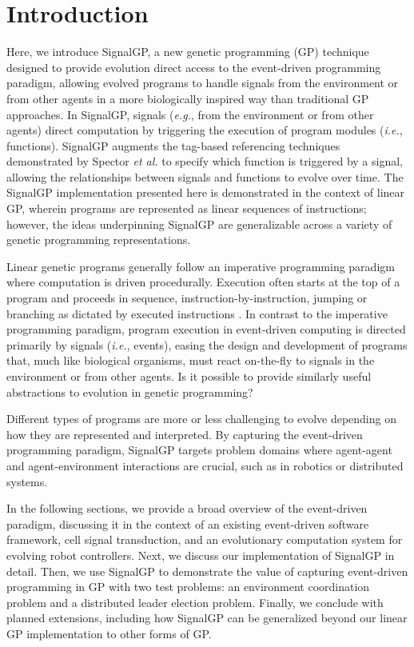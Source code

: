 \section{Introduction}

Here, we introduce SignalGP, a new genetic programming (GP) technique designed to provide evolution direct access to the event-driven programming paradigm, allowing evolved programs to handle signals from the environment or from other agents in a more biologically inspired way than traditional GP approaches. 
In SignalGP, signals (\textit{e.g.}, from the environment or from other agents) direct computation by triggering the execution of program modules (\textit{i.e.}, functions). 
SignalGP augments the tag-based referencing techniques demonstrated by Spector \textit{et al.}
\citep{spector_tag-based_2011,spector_whats_2011,spector_tag-based_2012} to specify which function is triggered by a signal, allowing the relationships between signals and functions to evolve over time. 
The SignalGP implementation presented here is demonstrated in the context of linear GP, wherein programs are represented as linear sequences of instructions; however, the ideas underpinning SignalGP are generalizable across a variety of genetic programming representations. 

Linear genetic programs generally follow an imperative programming paradigm where computation is driven procedurally.
Execution often starts at the top of a program and proceeds in sequence, instruction-by-instruction, jumping or branching as dictated by executed instructions \citep{brameier_linear_2007,mcdermott_genetic_2015}.
In contrast to the imperative programming paradigm, program execution in event-driven computing is directed primarily by signals (\textit{i.e.}, events), easing the design and development of programs that, much like biological organisms, must react on-the-fly to signals in the environment or from other agents. 
Is it possible to provide similarly useful abstractions to evolution in genetic programming? 

Different types of programs are more or less challenging to evolve depending on how they are represented and interpreted.  
By capturing the event-driven programming paradigm, SignalGP targets problem domains where agent-agent and agent-environment interactions are crucial, such as in robotics or distributed systems. 

In the following sections, we provide a broad overview of the event-driven paradigm, discussing it in the context of an existing event-driven software framework, cell signal transduction, and an evolutionary computation system for evolving robot controllers. 
Next, we discuss our implementation of SignalGP in detail. 
Then, we use SignalGP to demonstrate the value of capturing event-driven programming in GP with two test problems: an environment coordination problem and a distributed leader election problem. 
Finally, we conclude with planned extensions, including how SignalGP can be generalized beyond our linear GP implementation to other forms of GP. 